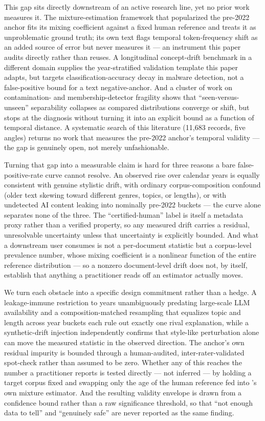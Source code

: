 \documentclass[conference]{IEEEtran}
\begin{document}
This gap sits directly downstream of an active research line, yet no prior work measures it. The mixture-estimation framework that popularized the pre-2022 anchor \cite{MonitorAIScale} fits its mixing coefficient against a fixed human reference and treats it as unproblematic ground truth; its own text flags temporal token-frequency shift as an added source of error but never measures it --- an instrument this paper audits directly rather than reuses. A longitudinal concept-drift benchmark in a different domain \cite{LAMDA} supplies the year-stratified validation template this paper adapts, but targets classification-accuracy decay in malware detection, not a false-positive bound for a text negative-anchor. And a cluster of work on contamination- and membership-detector fragility \cite{BenchContamFragility,MinKpp,ContamICL,MarkovCalib} shows that ``seen-versus-unseen'' separability collapses as compared distributions converge or shift, but stops at the diagnosis without turning it into an explicit bound as a function of temporal distance. A systematic search of this literature (11,683 records, five angles) returns no work that measures the pre-2022 anchor's temporal validity --- the gap is genuinely open, not merely unfashionable.

Turning that gap into a measurable claim is hard for three reasons a bare false-positive-rate curve cannot resolve. An observed rise over calendar years is equally consistent with genuine stylistic drift, with ordinary corpus-composition confound (older text skewing toward different genres, topics, or lengths), or with undetected AI content leaking into nominally pre-2022 buckets --- the curve alone separates none of the three. The ``certified-human'' label is itself a metadata proxy rather than a verified property, so any measured drift carries a residual, unresolvable uncertainty unless that uncertainty is explicitly bounded. And what a downstream user consumes is not a per-document statistic but a corpus-level prevalence number, whose mixing coefficient is a nonlinear function of the entire reference distribution --- so a nonzero document-level drift does not, by itself, establish that anything a practitioner reads off an estimator actually moves.

We turn each obstacle into a specific design commitment rather than a hedge. A leakage-immune restriction to years unambiguously predating large-scale LLM availability and a composition-matched resampling that equalizes topic and length across year buckets each rule out exactly one rival explanation, while a synthetic-drift injection independently confirms that style-like perturbation alone can move the measured statistic in the observed direction. The anchor's own residual impurity is bounded through a human-audited, inter-rater-validated spot-check rather than assumed to be zero. Whether any of this reaches the number a practitioner reports is tested directly --- not inferred --- by holding a target corpus fixed and swapping only the age of the human reference fed into \cite{MonitorAIScale}'s own mixture estimator. And the resulting validity envelope is drawn from a confidence bound rather than a raw significance threshold, so that ``not enough data to tell'' and ``genuinely safe'' are never reported as the same finding.
\end{document}
